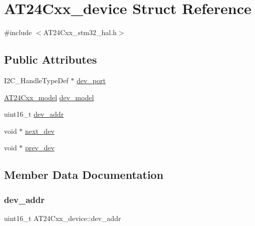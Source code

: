\hypertarget{structAT24Cxx__device}{}\section{A\+T24\+Cxx\+\_\+device Struct Reference}
\label{structAT24Cxx__device}


{\ttfamily \#include $<$A\+T24\+Cxx\+\_\+stm32\+\_\+hal.\+h$>$}

\subsection*{Public Attributes}
\begin{DoxyCompactItemize}
\item 
I2\+C\+\_\+\+Handle\+Type\+Def $\ast$ \hyperlink{structAT24Cxx__device_a8019b43b297b6e72d67d4290dd283239}{dev\+\_\+port}
\item 
\hyperlink{AT24Cxx__stm32__hal_8h_acf0e41d1c3fd815f3aca979089e48ffa}{A\+T24\+Cxx\+\_\+model} \hyperlink{structAT24Cxx__device_ae191d49355fa836cff4d315dfd8c0818}{dev\+\_\+model}
\item 
uint16\+\_\+t \hyperlink{structAT24Cxx__device_a45e6fa34136586e6ab9d7cf5652ec131}{dev\+\_\+addr}
\item 
void $\ast$ \hyperlink{structAT24Cxx__device_ab0b5bedb44c25eed61b0b4c6b6dc4b68}{next\+\_\+dev}
\item 
void $\ast$ \hyperlink{structAT24Cxx__device_a9f98ca24de54367231ee76f91f1e377a}{prev\+\_\+dev}
\end{DoxyCompactItemize}


\subsection{Member Data Documentation}
\mbox{\label{structAT24Cxx__device_a45e6fa34136586e6ab9d7cf5652ec131}} 
\subsubsection{\texorpdfstring{dev\+\_\+addr}{dev\_addr}}
{\footnotesize\ttfamily uint16\+\_\+t A\+T24\+Cxx\+\_\+device\+::dev\+\_\+addr}

\mbox{\label{structAT24Cxx__device_ae191d49355fa836cff4d315dfd8c0818}} 

